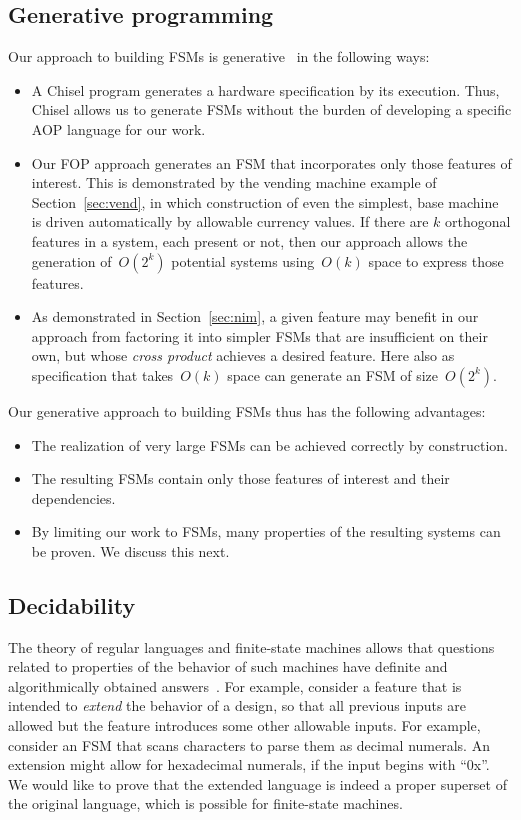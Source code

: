 \documentclass[sigplan,anonymous,review]{acmart}
\begin{document}
\subsection{Generative programming}\label{sec:priorgen}
Our approach to building FSMs is generative~\cite{10.1007/11527800_24} in the following ways:
\begin{itemize}
    \item A Chisel program generates a hardware specification by its execution.  Thus, Chisel allows us to generate FSMs without the burden of developing a specific AOP language for our work.
    \item Our FOP approach generates an FSM that incorporates only those features of interest.  This is demonstrated by the vending machine example of Section~\ref{sec:vend}, in which construction of even the simplest, base machine is driven automatically by allowable currency values.  If there are $k$ orthogonal features in a system, each present or not, then our approach allows the generation of~$O(2^{k})$ potential systems using~$O(k)$ space to express those features.
    \item As demonstrated in Section~\ref{sec:nim}, a given feature may benefit in our approach from factoring it into simpler FSMs that are insufficient on their own, but whose \emph{cross product} achieves a desired feature.  Here also as specification that takes~$O(k)$ space can generate an FSM of size~$O(2^{k})$.
\end{itemize}
Our generative approach to building FSMs thus has the following advantages:
\begin{itemize}
    \item The realization of very large FSMs can be achieved correctly by construction.
    \item The resulting FSMs contain only those features of interest and their dependencies.
    \item By limiting our work to FSMs, many properties of the resulting systems can be proven.  We discuss this next.
\end{itemize}
  
\subsection{Decidability}\label{sec:decide}

The theory of regular languages and finite-state machines allows that questions related to properties of the behavior of such machines have definite and algorithmically obtained answers~\cite{sipser}. For example, consider a feature that is intended to \emph{extend} the behavior of a design, so that all previous inputs are allowed but the feature introduces some other allowable inputs. For example, consider an FSM that scans characters to parse them as decimal numerals.  An extension might allow for hexadecimal numerals, if the input begins with ``0x''.  We would like to prove that the extended language is indeed a proper superset of the original language, which is possible for finite-state machines.
\end{document}
